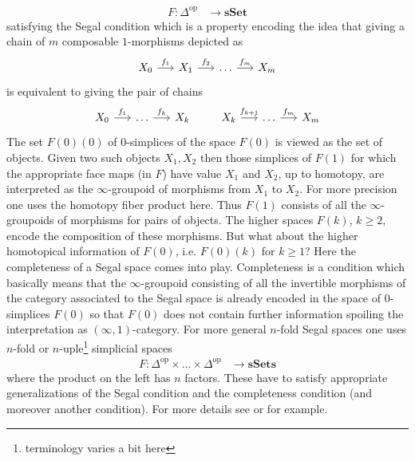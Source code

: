 \begin{align*}
  F
  \colon
  \Delta^{\mathrm{op}}
  &\to
  \mathbf{sSet}
\end{align*}
satisfying the Segal condition which is a property encoding the idea that giving a chain of $m$ composable $1$-morphisms depicted as
\begin{equation*}
\begin{tikzcd}[row sep=3em,column sep=1.5em]
  X_{0}
  \ar{r}{f_{1}}
  &
  X_{1}
  \ar{r}{f_{2}}
  &
  \ldots
  \ar{r}{f_{m}}
  &
  X_{m}
\end{tikzcd}
\end{equation*}
is equivalent to giving the pair of chains
\begin{equation*}
\begin{tikzcd}[row sep=3em,column sep=1.5em]
  X_{0}
  \ar{r}{f_{1}}
  &
  \ldots
  \ar{r}{f_{k}}
  &
  X_{k}
\end{tikzcd}
\qquad
\begin{tikzcd}[row sep=3em,column sep=1.5em]
  X_{k}
  \ar{r}{f_{k+1}}
  &
  \ldots
  \ar{r}{f_{m}}
  &
  X_{m}
\end{tikzcd}
\end{equation*}
The set $F(0)(0)$ of $0$-simplices of the space $F(0)$ is viewed as the set of objects. Given two such objects $X_{1},X_{2}$ then those simplices of $F(1)$ for which the appropriate face maps (in $F$) have value $X_{1}$ and $X_{2}$, up to homotopy, are interpreted as the $\infty$-groupoid of morphisms from $X_{1}$ to $X_{2}$. For more precision one uses the homotopy fiber product here. Thus $F(1)$ consists of all the $\infty$-groupoids of morphisms for pairs of objects. The higher spaces $F(k)$, $k \geq 2$, encode the composition of these morphisms. But what about the higher homotopical information of $F(0)$, i.e. $F(0)(k)$ for $k \geq 1$? Here the completeness of a Segal space comes into play. Completeness is a condition which basically means that the $\infty$-groupoid consisting of all the invertible morphisms of the category associated to the Segal space is already encoded in the space of $0$-simplices $F(0)$ so that $F(0)$ does not contain further information spoiling the interpretation as $(\infty,1)$-category. For more general $n$-fold Segal spaces one uses $n$-fold or $n$-uple\footnote{terminology varies a bit here} simplicial spaces
\begin{align*}
  F
  \colon
  \Delta^{\mathrm{op}}
  \times
  \ldots
  \times
  \Delta^{\mathrm{op}}
  &\to
  \mathbf{sSets}
\end{align*}
where the product on the left has $n$ factors. These have to satisfy appropriate generalizations of the Segal condition and the completeness condition (and moreover another condition). For more details see \cite{9094cf60} or \cite{29781dd2} for example.
